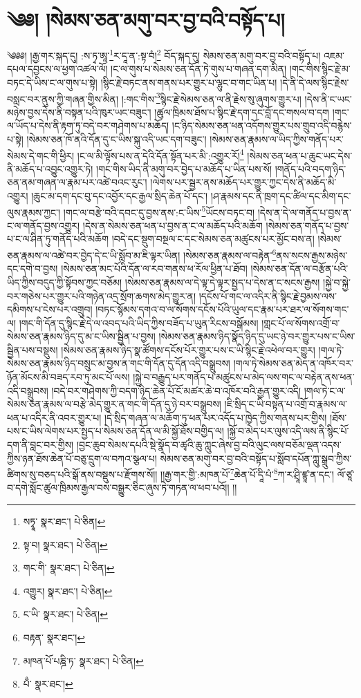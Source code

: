 \setcounter{footnote}{0} 
\chapter{༄༅། །སེམས་ཅན་མགུ་བར་བྱ་བའི་བསྟོད་པ།}༄༅༅། །རྒྱ་གར་སྐད་དུ། :ས་ཏྭ་ཨཱ་\footnote{སཏྭཱ་  སྣར་ཐང་།  པེ་ཅིན། }ར་དཱ་ན་:སྟ་བཾ།\footnote{སྟ་བ།  སྣར་ཐང་།  པེ་ཅིན། } བོད་སྐད་དུ། སེམས་ཅན་མགུ་བར་བྱ་བའི་བསྟོད་པ། འཇམ་དཔལ་དབྱངས་ལ་ཕྱག་འཚལ་ལོ། །ང་ལ་གུས་པ་སེམས་ཅན་དོན་ཏེ་གུས་པ་གཞན་དག་མིན། །གང་གིས་སྙིང་རྗེ་མ་བཏང་དེ་ཡིས་ང་ལ་གུས་པ་སྟེ། །སྙིང་རྗེ་བཏང་ནས་གནས་པར་གྱུར་པ་ལྷུང་བ་གང་ཡིན་པ། །དེ་ནི་དེ་ལས་སྙིང་རྗེས་བསླང་བར་ནུས་ཀྱི་གཞན་གྱིས་མིན། །:གང་གིས་\footnote{གང་གི་  སྣར་ཐང་།  པེ་ཅིན། }སྙིང་རྗེ་སེམས་ཅན་ལ་ནི་རྗེས་སུ་ཞུགས་གྱུར་པ། །དེས་ནི་ང་ཡང་མཉེས་བྱས་དེས་ནི་བསྟན་པའི་ཁུར་ཡང་བཟུང་། །ཚུལ་ཁྲིམས་ཐོས་པ་སྙིང་རྗེ་དག་དང་བློ་དང་གསལ་བ་དག །གང་ལ་ཡོད་པ་དེས་ནི་རྟག་ཏུ་བདེ་བར་གཤེགས་པ་མཆོད། །ང་ཉིད་སེམས་ཅན་ཕན་འདོགས་གྱུར་པས་གྲུབ་འདི་བརྙེས་པ་སྟེ། །སེམས་ཅན་ཁོ་ནའི་དོན་དུ་ང་ཡིས་སྐུ་འདི་ཡང་དག་བཟུང་། །སེམས་ཅན་རྣམས་ལ་ཡིད་ཀྱིས་གནོད་པར་སེམས་དེ་གང་གི་ཕྱིར། །ང་ལ་མི་ལྟོས་པས་ན་དེའི་དོན་སྟོན་པར་མི་:འགྱུར་རོ།\footnote{འགྱུར།  སྣར་ཐང་།  པེ་ཅིན། } །སེམས་ཅན་ཕན་པ་ཆུང་ཡང་དེས་ནི་མཆོད་པ་འབྱུང་འགྱུར་ཏེ། །གང་གིས་ཡིད་ནི་མགུ་བར་བྱེད་པ་མཆོད་པ་ཡིན་པས་སོ། །གནོད་པའི་བདག་ཉིད་ཅན་ནམ་གཞན་ལ་རྣམ་པར་འཚེ་བའང་རུང་། །ལེགས་པར་སྦྱར་ནས་མཆོད་པར་གྱུར་ཀྱང་དེས་ནི་མཆོད་མི་འགྱུར། །ཆུང་མ་དག་དང་བུ་དང་འབྱོར་དང་རྒྱལ་སྲིད་ཆེན་པོ་དང་། །ཤ་རྣམས་དང་ནི་ཁྲག་དང་ཚིལ་དང་མིག་དང་ལུས་རྣམས་ཀྱང་། །གང་ལ་བརྩེ་བའི་དབང་དུ་བྱས་ནས་:ང་ཡིས་\footnote{ང་ཡི་  སྣར་ཐང་།  པེ་ཅིན། }ཡོངས་བཏང་བ། །དེས་ན་དེ་ལ་གནོད་པ་བྱས་ན་ང་ལ་གནོད་བྱས་འགྱུར། །དེས་ན་སེམས་ཅན་ཕན་པ་བྱས་ན་ང་ལ་མཆོད་པའི་མཆོག །སེམས་ཅན་གནོད་པ་བྱས་པ་ང་ལ་ཤིན་ཏུ་གནོད་པའི་མཆོག །བདེ་དང་སྡུག་བསྔལ་ང་དང་སེམས་ཅན་མཚུངས་པར་མྱོང་བས་ན། །སེམས་ཅན་རྣམས་ལ་འཚེ་བར་བྱེད་དེ་ང་ཡི་སློབ་མ་ཇི་ལྟར་ཡིན། །སེམས་ཅན་རྣམས་ལ་བརྟེན་\footnote{བརྟན་  སྣར་ཐང་། }ནས་སངས་རྒྱས་མཉེས་དང་དགེ་བ་བྱས། །སེམས་ཅན་མང་པོའི་དོན་ལ་རབ་གནས་ཕ་རོལ་ཕྱིན་པ་ཐོབ། །སེམས་ཅན་དོན་ལ་བརྩོན་པའི་ཡིད་ཀྱིས་བདུད་ཀྱི་སྟོབས་ཀྱང་བཅོམ། །སེམས་ཅན་རྣམས་ལ་དེ་ལྟ་དེ་ལྟར་སྤྱད་པ་དེས་ན་ང་སངས་རྒྱས། །སྐྱེ་བ་སྐྱེ་བར་གཅེས་པར་གྱུར་པའི་གཉེན་འདྲ་སྲོག་ཆགས་མེད་གྱུར་ན། །དངོས་པོ་གང་ལ་འདིར་ནི་སྙིང་རྗེ་བྱམས་ལས་དམིགས་པ་ངེས་པར་འགྲུབ། །བཏང་སྙོམས་དགའ་བ་ལ་སོགས་དངོས་པོའི་ཡུལ་དང་རྣམ་པར་ཐར་ལ་སོགས་གང་ལ། །གང་གི་དོན་དུ་སྙིང་རྗེ་དེ་ལ་འབད་པའི་ཡིད་ཀྱིས་བཟོད་པ་ཡུན་རིངས་བསྒོམས། །གླང་པོ་ལ་སོགས་འགྲོ་བ་སེམས་ཅན་རྣམས་ཉིད་དུ་མ་ང་ཡིས་སྦྱིན་པ་བྱས། །སེམས་ཅན་རྣམས་ཉིད་སྣོད་ཉིད་དུ་ཡང་ཉེ་བར་གྱུར་པས་ང་ཡིས་སྦྱིན་པས་བསྡུས། །སེམས་ཅན་རྣམས་ཉིད་སྣ་ཚོགས་དངོས་པོར་གྱུར་པས་ང་ཡི་སྙིང་རྗེ་འཕེལ་བར་གྱུར། །གལ་ཏེ་སེམས་ཅན་རྣམས་ཉིད་བསྲུང་མ་བྱས་ན་གང་གི་དོན་དུ་དོན་འདི་བསྒྲུབས། །གལ་ཏེ་སེམས་ཅན་མེད་ན་འཁོར་བར་ཉོན་མོངས་མི་བཟད་རབ་ཏུ་མང་པོ་ལས། །སྐྱེ་བ་བརྒྱུད་པར་གནོད་པ་མཚུངས་པ་མེད་ལས་གང་ལ་བརྟེན་ནས་ཕན་འདི་བསྒྲུབས། །བདེ་བར་གཤེགས་ཀྱི་བདག་ཉིད་ཆེན་པོ་ངོ་མཚར་ཆེ་བ་འཁོར་བའི་རྒྱན་གྱུར་འདི། །གལ་ཏེ་ང་ལ་སེམས་ཅན་རྣམས་ལ་བརྩེ་མེད་གྱུར་ན་གང་གི་དོན་དུ་ཉེ་བར་བསྒྲུབས། །ཇི་སྲིད་ང་ཡི་བསྟན་པ་འགྲོ་བ་རྣམས་ལ་ཕན་པ་འདིར་ནི་འབར་གྱུར་པ། །དེ་སྲིད་གཞན་ལ་མཆོག་ཏུ་ཕན་པར་འདོད་པ་ཁྱེད་ཀྱིས་གནས་པར་གྱིས། །ཐོས་པས་ང་ཡིས་ལེགས་པར་སྤྱད་པ་སེམས་ཅན་དོན་ལ་མི་སྐྱོ་ཐོས་བགྱིད་ལ། །སྐྱོ་བ་མེད་པར་ལུས་འདི་ལས་ནི་སྙིང་པོ་དག་ནི་བླང་བར་གྱིས། །བྱང་ཆུབ་སེམས་དཔའི་སྡེ་སྣོད་བ་ཚྭའི་ཆུ་ཀླུང་ཞེས་བྱ་བའི་ལུང་ལས་བཅོམ་ལྡན་འདས་ཀྱིས་ཉན་ཐོས་ཆེན་པོ་བཅུ་དྲུག་ལ་བཀའ་སྩལ་པ། སེམས་ཅན་མགུ་བར་བྱ་བའི་བསྟོད་པ་སློབ་དཔོན་ཀླུ་སྒྲུབ་ཀྱིས་ཚིགས་སུ་བཅད་པའི་སྒོ་ནས་བསྡུས་པ་རྫོགས་སོ།། །།རྒྱ་གར་གྱི་:མཁན་པོ་\footnote{མཁན་པོ་པཎྜི་ཏ་  སྣར་ཐང་།  པེ་ཅིན། }ཆེན་པོ་དཱི་པཾ་\footnote{པྃ་  སྣར་ཐང་། }ཀ་ར་ཤྲཱི་ཛྙཱ་ན་དང་། ལོ་ཙཱ་བ་དགེ་སློང་ཚུལ་ཁྲིམས་རྒྱལ་བས་བསྒྱུར་ཅིང་ཞུས་ཏེ་གཏན་ལ་ཕབ་པའོ།། །།